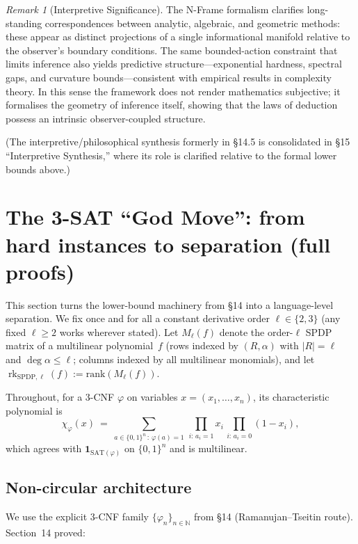\documentclass[12pt]{article}
\theoremstyle{definition}
\theoremstyle{definition}
\theoremstyle{remark}
\newtheorem{remark}{Remark}
\theoremstyle{remark}
\begin{document}
\begin{remark}[Interpretive Significance]
The N-Frame formalism clarifies long-standing correspondences between analytic, algebraic, and geometric methods: these appear as distinct projections of a single informational manifold relative to the observer's boundary conditions. The same bounded-action constraint that limits inference also yields predictive structure---exponential hardness, spectral gaps, and curvature bounds---consistent with empirical results in complexity theory. In this sense the framework does not render mathematics subjective; it formalises the geometry of inference itself, showing that the laws of deduction possess an intrinsic observer-coupled structure.
\end{remark}

\noindent
(The interpretive/philosophical synthesis formerly in \S14.5 is consolidated in \S15 ``Interpretive Synthesis,'' where its role is clarified relative to the formal lower bounds above.)

\section{The 3-SAT ``God Move'': from hard instances to separation (full proofs)}

This section turns the lower-bound machinery from \S14 into a language-level separation.
We fix once and for all a constant derivative order $\ell\in\{2,3\}$ (any fixed $\ell\ge2$ works wherever stated).
Let $M_\ell(f)$ denote the order-$\ell$ SPDP matrix of a multilinear polynomial~$f$ (rows indexed by $(R,\alpha)$ with $|R|=\ell$ and $\deg\alpha\le\ell$; columns indexed by all multilinear monomials), and let $\operatorname{rk}_{\mathrm{SPDP},\ell}(f):=\mathrm{rank}(M_\ell(f))$.

Throughout, for a 3-CNF $\varphi$ on variables $x=(x_1,\dots,x_n)$, its characteristic polynomial is
\[
\chi_\varphi(x)\ =\ \sum_{a\in\{0,1\}^n\,:\,\varphi(a)=1}\,\prod_{i:\,a_i=1} x_i\,\prod_{i:\,a_i=0}(1-x_i),
\]
which agrees with $\mathbf{1}_{\mathrm{SAT}(\varphi)}$ on $\{0,1\}^n$ and is multilinear.

\subsection{Non-circular architecture}

We use the explicit 3-CNF family $\{\varphi_n\}_{n\in\mathbb{N}}$ from \S14 (Ramanujan--Tseitin route). Section~14 proved:
\end{document}
